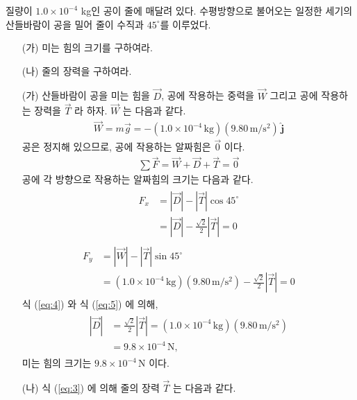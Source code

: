 \documentclass[floatfix,nofootinbib,superscriptaddress,fleqn,preprint]{revtex4}
\begin{document}
질량이 $1.0\times 10^{-4}$ kg인 공이 줄에 매달려 있다. 수평방향으로
불어오는 일정한 세기의 산들바람이 공을 밀어 줄이 수직과 $45^\circ$를
이루었다.
\begin{itemize}
\item[(가)] 미는 힘의 크기를 구하여라.
\item[(나)] 줄의 장력을 구하여라.
\end{itemize}

\begin{itemize}
  \item[(가)]
  산들바람이 공을 미는 힘을 $\vec{D}$, 공에 작용하는 중력을
  $\vec{W}$ 그리고 공에 작용하는 장력을 $\vec{T}$ 라 하자.
  $\vec{W}$ 는 다음과 같다.
  \begin{align}
    \vec{W} = m\vec{g} 
    = -(1.0\times 10^{-4}\,\mathrm{kg})(9.80\,\mathrm{m/s^2})\,\hat{\bm{j}}
  \end{align}
  공은 정지해 있으므로, 공에 작용하는 알짜힘은 $\vec{0}$ 이다.
  \begin{align}\label{eq:3}
    \sum\vec{F}=\vec{W}+\vec{D}+\vec{T} = \vec{0}
  \end{align}
공에 각 방향으로 작용하는 알짜힘의 크기는 다음과 같다.
\begin{align}\label{eq:4}
  \begin{split}
    F_x &= |\vec{D}|-|\vec{T}|\cos{45^{\circ}} \\
    &= |\vec{D}|-\frac{\sqrt{2}}{2}|\vec{T}|
    = 0   
  \end{split}
\end{align}
\begin{align}\label{eq:5}
  \begin{split}
    F_y &= |\vec{W}|-|\vec{T}|\sin{45^{\circ}}  \\
    &= (1.0\times 10^{-4}\,\mathrm{kg})(9.80\,\mathrm{m/s^2})
    -\frac{\sqrt{2}}{2}|\vec{T}|
    = 0
  \end{split}
\end{align}
식 (\ref{eq:4}) 와 식 (\ref{eq:5}) 에 의해,
\begin{align}
  \begin{split}
    |\vec{D}| &= \frac{\sqrt{2}}{2}|\vec{T}|
    = (1.0\times 10^{-4}\,\mathrm{kg})(9.80\,\mathrm{m/s^2})  \\
    &=9.8\times 10^{-4}\,\mathrm{N},
  \end{split}
\end{align}
미는 힘의 크기는 $9.8\times 10^{-4}\,\mathrm{N}$ 이다.
\item[(나)] 식 (\ref{eq:3}) 에 의해 줄의 장력 $\vec{T}$ 는 다음과 같다.

\end{itemize}
\end{document}
